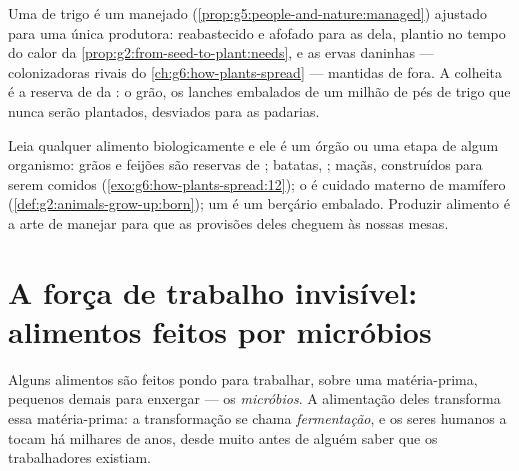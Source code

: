 \begin{example}\label{ex:g6:producing-our-food:wheat}
Uma  de trigo é um  manejado
(\cref{prop:g5:people-and-nature:managed}) ajustado para uma única
produtora:  reabastecido e afofado para as  dela, plantio no
tempo do calor da \cref{prop:g2:from-seed-to-plant:needs}, e as ervas
daninhas --- colonizadoras rivais do
\cref{ch:g6:how-plants-spread} --- mantidas de fora. A colheita é a
reserva de  da : o grão, os lanches embalados de um
milhão de pés de trigo que nunca serão plantados, desviados para as
padarias.
\end{example}

\begin{remark}\label{rem:g6:producing-our-food:stage}
Leia qualquer alimento biologicamente e ele é um órgão ou uma etapa de
algum organismo: grãos e feijões são reservas de ; batatas,
; maçãs,  construídos para serem comidos
(\cref{exo:g6:how-plants-spread:12}); o  é cuidado materno de
mamífero (\cref{def:g2:animals-grow-up:born}); um  é um berçário
embalado. Produzir alimento é a arte de manejar  para
que as provisões deles cheguem às nossas mesas.
\end{remark}

\section{A força de trabalho invisível: alimentos feitos por micróbios}

\begin{definition}[Fermentação]\label{def:g6:producing-our-food:fermentation}
Alguns alimentos são feitos pondo para trabalhar, sobre uma
matéria-prima,  pequenos demais para enxergar --- os
\emph{micróbios}. A alimentação deles
transforma essa matéria-prima: a transformação se chama
\emph{fermentação}, e os seres humanos a tocam há
milhares de anos, desde muito antes de alguém saber que os
trabalhadores existiam.
\end{definition}

